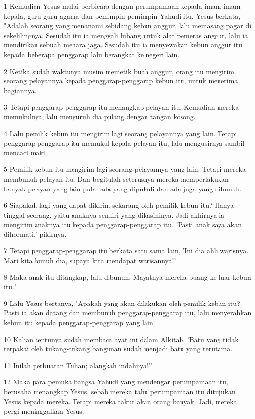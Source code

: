 \par 1 Kemudian Yesus mulai berbicara dengan perumpamaan kepada imam-imam kepala, guru-guru agama dan pemimpin-pemimpin Yahudi itu. Yesus berkata, "Adalah seorang yang menanami sebidang kebun anggur, lalu memasang pagar di sekelilingnya. Sesudah itu ia menggali lubang untuk alat pemeras anggur, lalu ia mendirikan sebuah menara jaga. Sesudah itu ia menyewakan kebun anggur itu kepada beberapa penggarap lalu berangkat ke negeri lain.
\par 2 Ketika sudah waktunya musim memetik buah anggur, orang itu mengirim seorang pelayannya kepada penggarap-penggarap kebun itu, untuk menerima bagiannya.
\par 3 Tetapi penggarap-penggarap itu menangkap pelayan itu. Kemudian mereka memukulnya, lalu menyuruh dia pulang dengan tangan kosong.
\par 4 Lalu pemilik kebun itu mengirim lagi seorang pelayannya yang lain. Tetapi penggarap-penggarap itu memukul kepala pelayan itu, lalu mengusirnya sambil mencaci maki.
\par 5 Pemilik kebun itu mengirim lagi seorang pelayannya yang lain. Tetapi mereka membunuh pelayan itu. Dan begitulah seterusnya mereka memperlakukan banyak pelayan yang lain pula: ada yang dipukuli dan ada juga yang dibunuh.
\par 6 Siapakah lagi yang dapat dikirim sekarang oleh pemilik kebun itu? Hanya tinggal seorang, yaitu anaknya sendiri yang dikasihinya. Jadi akhirnya ia mengirim anaknya itu kepada penggarap-penggarap itu. 'Pasti anak saya akan dihormati,' pikirnya.
\par 7 Tetapi penggarap-penggarap itu berkata satu sama lain, 'Ini dia ahli warisnya. Mari kita bunuh dia, supaya kita mendapat warisannya!'
\par 8 Maka anak itu ditangkap, lalu dibunuh. Mayatnya mereka buang ke luar kebun itu."
\par 9 Lalu Yesus bertanya, "Apakah yang akan dilakukan oleh pemilik kebun itu? Pasti ia akan datang dan membunuh penggarap-penggarap itu, lalu menyerahkan kebun itu kepada penggarap-penggarap yang lain.
\par 10 Kalian tentunya sudah membaca ayat ini dalam Alkitab, 'Batu yang tidak terpakai oleh tukang-tukang bangunan sudah menjadi batu yang terutama.
\par 11 Inilah perbuatan Tuhan; alangkah indahnya!'"
\par 12 Maka para pemuka bangsa Yahudi yang mendengar perumpamaan itu, berusaha menangkap Yesus, sebab mereka tahu perumpamaan itu ditujukan Yesus kepada mereka. Tetapi mereka takut akan orang banyak. Jadi, mereka pergi meninggalkan Yesus.
